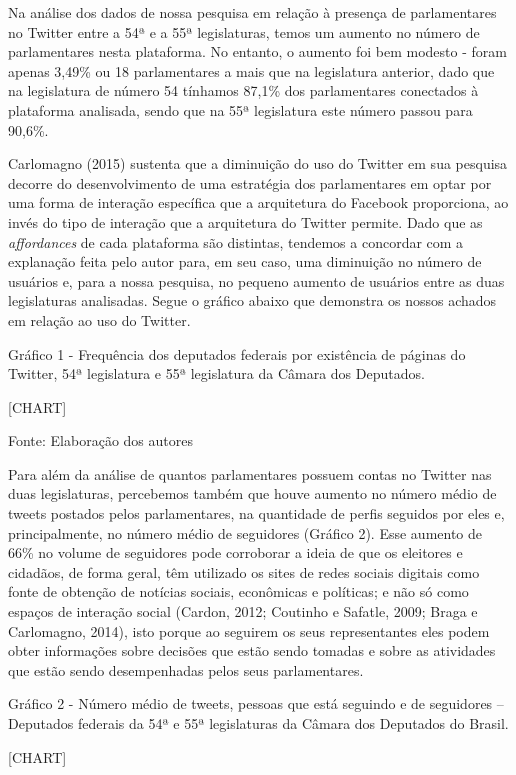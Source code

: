 Na análise dos dados de nossa pesquisa em relação à presença de
parlamentares no Twitter entre a 54ª e a 55ª legislaturas, temos um
aumento no número de parlamentares nesta plataforma. No entanto, o
aumento foi bem modesto - foram apenas 3,49\% ou 18 parlamentares a mais
que na legislatura anterior, dado que na legislatura de número 54
tínhamos 87,1\% dos parlamentares conectados à plataforma analisada,
sendo que na 55ª legislatura este número passou para 90,6\%.

Carlomagno (2015) sustenta que a diminuição do uso do Twitter em sua
pesquisa decorre do desenvolvimento de uma estratégia dos parlamentares
em optar por uma forma de interação específica que a arquitetura do
Facebook proporciona, ao invés do tipo de interação que a arquitetura do
Twitter permite. Dado que as \emph{affordances} de cada plataforma são
distintas, tendemos a concordar com a explanação feita pelo autor para,
em seu caso, uma diminuição no número de usuários e, para a nossa
pesquisa, no pequeno aumento de usuários entre as duas legislaturas
analisadas. Segue o gráfico abaixo que demonstra os nossos achados em
relação ao uso do Twitter.

Gráfico 1 - Frequência dos deputados federais por existência de páginas
do Twitter, 54ª legislatura e 55ª legislatura da Câmara dos Deputados.

{{[}CHART{]}}

Fonte: Elaboração dos autores

Para além da análise de quantos parlamentares possuem contas no Twitter
nas duas legislaturas, percebemos também que houve aumento no número
médio de tweets postados pelos parlamentares, na quantidade de perfis
seguidos por eles e, principalmente, no número médio de seguidores
(Gráfico 2). Esse aumento de 66\% no volume de seguidores pode
corroborar a ideia de que os eleitores e cidadãos, de forma geral, têm
utilizado os sites de redes sociais digitais como fonte de obtenção de
notícias sociais, econômicas e políticas; e não só como espaços de
interação social (Cardon, 2012; Coutinho e Safatle, 2009; Braga e
Carlomagno, 2014), isto porque ao seguirem os seus representantes eles
podem obter informações sobre decisões que estão sendo tomadas e sobre
as atividades que estão sendo desempenhadas pelos seus parlamentares.

Gráfico 2 - Número médio de tweets, pessoas que está seguindo e de
seguidores -- Deputados federais da 54ª e 55ª legislaturas da Câmara dos
Deputados do Brasil.

{{[}CHART{]}}

